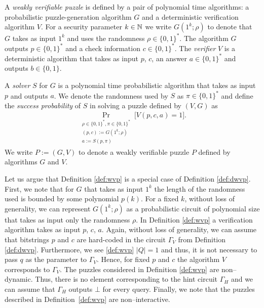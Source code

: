 \begin{definition}
  \label{def:wvp}
A \textit{weakly verifiable puzzle} is defined by a pair of polynomial time algorithms:
a probabilistic puzzle-generation algorithm $G$ and a deterministic verification algorithm $V$.
For a security parameter $k \in \mathbb{N}$ we write $G(1^k; \rho)$ to denote that $G$ takes as input $1^k$
and uses the randomness $\rho \in \{0,1\}^{*}$.
The algorithm $G$ outputs $p \in \{0,1\}^{*}$ and a check information $c \in \{0,1\}^{*}$.
The \textit{verifier} $V$ is a deterministic algorithm that takes as input $p$, $c$, an answer $a \in \{0,1\}^{*}$
and outputs $b \in \{0,1\}$.

A \textit{solver} $S$ for $G$ is a polynomial time probabilistic algorithm that
takes as input $p$ and outputs $a$. We denote the randomness used by $S$ as $\pi \in \{0,1\}^{*}$
and define the \textit{success probability} of $S$ in solving a puzzle defined by $(V,G)$ as
\begin{align*}
  \underset{\substack{\rho \in \{0,1\}^{*}, \pi \in \{0,1\}^{*} \\ (p,c):=G(1^k; \rho) \\ a := S(p, \pi)}}{\Pr}\Big[ V(p,c,a) = 1\Big].
\end{align*}
We write $P := (G,V)$ to denote a weakly verifiable puzzle $P$ defined by algorithms $G$ and $V$.
\end{definition}

Let us argue that Definition \ref{def:wvp} is a special case of Definition \ref{def:dwvp}.
First, we note that for $G$ that takes as input $1^k$ the length of the randomness used is bounded by some polynomial $p(k)$.
For a fixed $k$, without loss of generality, we can represent $G(1^k; \rho)$ as a probabilistic circuit of polynomial size
that takes as input only the randomness $\rho$.
In Definition \ref{def:wvp} a verification algorithm takes as input $p$, $c$, $a$.
Again, without loss of generality, we can assume that bitstrings $p$ and $c$ are hard-coded
in the circuit $\Gamma_V$ from Definition \ref{def:dwvp}.
Furthermore, we see \ref{def:wvp} $|Q| = 1$ and thus, it is not necessary to pass $q$ as the parameter to $\Gamma_V$.
Hence, for fixed $p$ and $c$ the algorithm $V$ corresponds to $\Gamma_V$.
The puzzles considered in Definition \ref{def:wvp} are non--dynamic.
Thus, there is no element corresponding to the hint circuit $\Gamma_H$ and we can assume that
$\Gamma_H$ outputs $\bot$ for every query.
Finally, we note that the puzzles described in Definition~\ref{def:wvp} are non--interactive.

